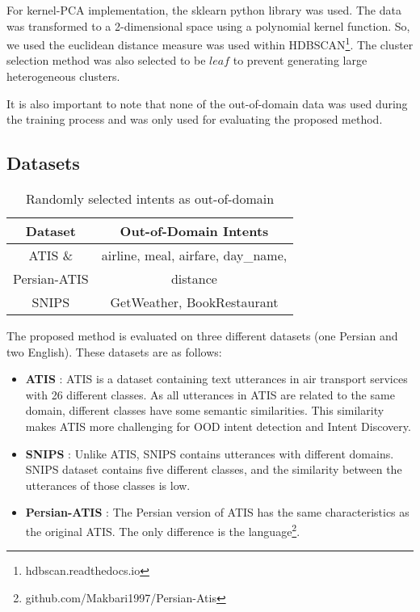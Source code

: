 \documentclass{article}
\begin{document}
For kernel-PCA implementation, the sklearn python library was used. 
The data was transformed to a 2-dimensional space using a polynomial kernel function. 
So, we used the euclidean distance measure was used within HDBSCAN\footnote{hdbscan.readthedocs.io}. 
The cluster selection method was also selected to be $leaf$ to prevent generating large heterogeneous clusters.

It is also important to note that none of the out-of-domain data was used during the training process and was only used for evaluating the proposed method.

\subsection{Datasets}\label{datasets}

\begin{table}[t!]
  \centering
  \caption{Randomly selected intents as out-of-domain}
  \label{tab1}
  \begin{tabular}{cc}
      \toprule
      Dataset  & Out-of-Domain Intents \\ \hline
      \midrule
      ATIS \&     & airline, meal, airfare, day\_name,        \\
      Persian-ATIS & distance \\ \hline
      SNIPS          & GetWeather, BookRestaurant        \\
      \bottomrule
  \end{tabular}
\end{table}

\noindent The proposed method is evaluated on three different datasets (one Persian and two English).
These datasets are as follows:
\begin{itemize}
  \item \textbf{ATIS} \cite{hemphill-etal-1990-atis}: ATIS is a dataset containing text utterances in air transport services with 26 different classes. As all utterances in ATIS are related to the same domain, different classes have some semantic similarities. This similarity makes ATIS more challenging for OOD intent detection and Intent Discovery.
  \item \textbf{SNIPS} \cite{coucke2018snips}: Unlike ATIS, SNIPS contains utterances with different domains. SNIPS dataset contains five different classes, and the similarity between the utterances of those classes is low.
  \item \textbf{Persian-ATIS} \cite{akbari2023persian}: The Persian version of ATIS has the same characteristics as the original ATIS. The only difference is the language\footnote{github.com/Makbari1997/Persian-Atis}.
\end{itemize}
\end{document}
